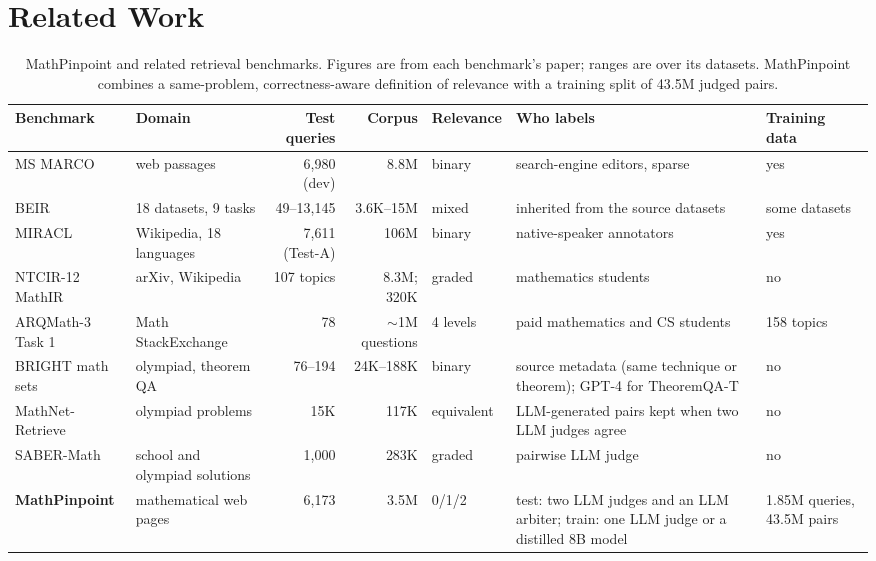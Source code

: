 \section{Related Work}
\label{sec:related}

\begin{table}[t]
\centering
\scriptsize
\setlength{\tabcolsep}{3.5pt}
\renewcommand{\arraystretch}{1.15}
\begin{tabular}{@{}P{2.75cm}P{2.0cm}rrP{0.95cm}P{3.75cm}P{1.75cm}@{}}
\toprule
Benchmark & Domain & Test queries & Corpus & Relevance & Who labels & Training data \\
\midrule
MS MARCO \citep{bajaj2018msmarco} & web passages & 6,980 (dev) & 8.8M & binary & search-engine editors, sparse & yes \\
BEIR \citep{thakur2021beir} & 18 datasets, 9 tasks & 49--13,145 & 3.6K--15M & mixed & inherited from the source datasets & some datasets \\
MIRACL \citep{zhang2023miracl} & Wikipedia, 18 languages & 7,611 (Test-A) & 106M & binary & native-speaker annotators & yes \\
\midrule
NTCIR-12 MathIR \citep{zanibbi2016ntcir12} & arXiv, Wikipedia & 107 topics & 8.3M; 320K & graded & mathematics students & no \\
ARQMath-3 Task 1 \citep{mansouri2022arqmath3wn} & Math StackExchange & 78 & $\sim$1M questions & 4 levels & paid mathematics and CS students & 158 topics \\
BRIGHT math sets \citep{su2025bright} & olympiad, theorem QA & 76--194 & 24K--188K & binary & source metadata (same technique or theorem); GPT-4 for TheoremQA-T & no \\
MathNet-Retrieve \citep{alshammari2026mathnet} & olympiad problems & 15K & 117K & equivalent & LLM-generated pairs kept when two LLM judges agree & no \\
SABER-Math \citep{georgiev2026sabermath} & school and olympiad solutions & 1,000 & 283K & graded & pairwise LLM judge & no \\
\midrule
\textbf{MathPinpoint} & mathematical web pages & 6,173 & 3.5M & 0/1/2 & test: two LLM judges and an LLM arbiter; train: one LLM judge or a distilled 8B model & 1.85M queries, 43.5M pairs \\
\bottomrule
\end{tabular}
\caption{MathPinpoint and related retrieval benchmarks. Figures are from each benchmark's paper; ranges are over its datasets. MathPinpoint combines a same-problem, correctness-aware definition of relevance with a training split of 43.5M judged pairs.}
\label{tab:compare}
\end{table}

